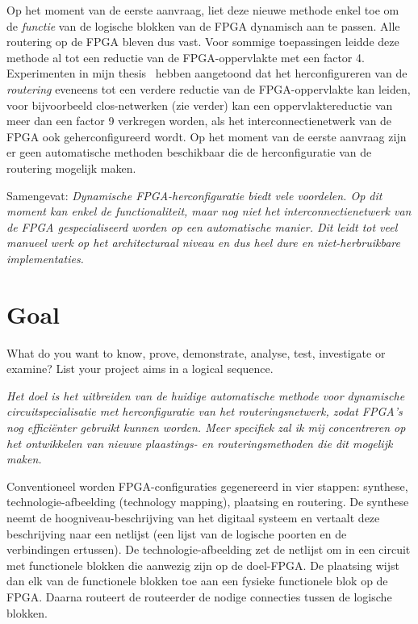 \documentclass[a4paper,oneside,12pt]{article}
\begin{document}
Op het moment van de eerste aanvraag, liet deze nieuwe methode enkel toe om de {\em functie} van de logische blokken van de FPGA dynamisch aan te passen. Alle routering op de FPGA bleven dus vast. Voor sommige toepassingen leidde deze methode al tot een reductie van de FPGA-oppervlakte met een factor 4. Experimenten in mijn thesis~\cite{mthesiselias} hebben aangetoond dat het herconfigureren van de {\em routering} eveneens tot een verdere reductie van de FPGA-oppervlakte kan leiden, voor bijvoorbeeld clos-netwerken (zie verder) kan een oppervlaktereductie van meer dan een factor 9 verkregen worden, als het interconnectienetwerk van de FPGA ook geherconfigureerd wordt. Op het moment van de eerste aanvraag zijn er geen automatische methoden beschikbaar die de herconfiguratie van de routering mogelijk maken. %

Samengevat: \emph{Dynamische FPGA-herconfiguratie biedt vele voordelen. Op dit moment kan enkel de functionaliteit, maar nog niet het interconnectienetwerk van de FPGA gespecialiseerd worden op een automatische manier. Dit leidt tot veel manueel werk op het architecturaal niveau en dus heel dure en niet-herbruikbare implementaties.} 

\newpage

\section{Goal}
What do you want to know, prove, demonstrate, analyse, test, investigate or examine? List your project aims in a logical sequence.

\emph{Het doel is het uitbreiden van de huidige automatische methode voor dynamische circuitspecialisatie met herconfiguratie van het routeringsnetwerk, zodat FPGA's nog effici\"enter gebruikt kunnen worden. Meer specifiek zal ik mij concentreren op het ontwikkelen van nieuwe plaastings- en routeringsmethoden die dit mogelijk maken.}

Conventioneel worden FPGA-configuraties gegenereerd in vier stappen: synthese, technologie-afbeelding (technology mapping), plaatsing en routering. De synthese neemt de hoogniveau-beschrijving van het digitaal systeem en vertaalt deze beschrijving naar een netlijst (een lijst van de logische poorten en de verbindingen ertussen). De technologie-afbeelding zet de netlijst om in een circuit met functionele blokken die aanwezig zijn op de doel-FPGA. De plaatsing wijst dan elk van de functionele blokken toe aan een fysieke functionele blok op de FPGA. Daarna routeert de routeerder de nodige connecties tussen de logische blokken. 
\end{document}
